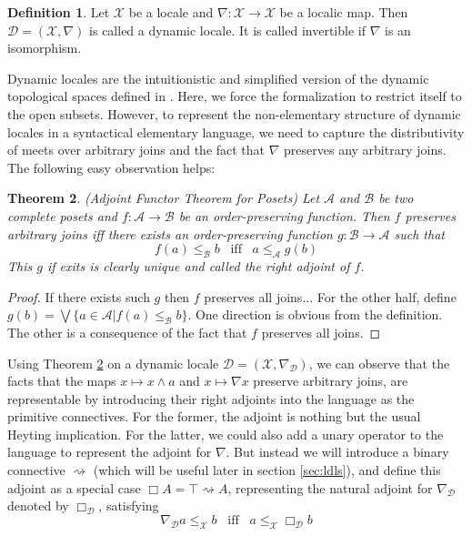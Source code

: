 \documentclass[12pt,a4paper]{article}
\theoremstyle{plain}
\newtheorem{thm}{Theorem}[section]
\theoremstyle{definition}
\newtheorem{dfn}[thm]{Definition}
\begin{document}
\begin{dfn}
Let $\mathscr{X}$ be a locale and $\nabla: \mathscr{X} \to \mathscr{X}$ be a localic map. Then $\mathcal{D}=(\mathscr{X}, \nabla)$ is called a dynamic locale. It is called invertible if $\nabla$ is an isomorphism.
\end{dfn}

Dynamic locales are the intuitionistic and simplified version of the dynamic topological spaces defined in \cite{}. Here, we force the formalization to restrict itself to the open subsets. However, to represent the non-elementary structure of dynamic locales in a syntactical elementary language, we need to capture the distributivity of meets over arbitrary joins and the fact that $\nabla$ preserves any arbitrary joins. The following easy observation helps:

\begin{thm}(Adjoint Functor Theorem for Posets) \label{AFT}
Let $\mathcal{A}$ and $\mathcal{B}$ be two complete posets and $f:\mathcal{A} \to \mathcal{B}$ be an order-preserving function. Then $f$ preserves arbitrary joins iff there exists an order-preserving function $g: \mathcal{B} \to \mathcal{A}$ such that
\[
f(a) \leq_{\mathcal{B}} b  \;\;\; \text{iff}  \;\;\; a \leq_{\mathcal{A}} g(b)
\]
This $g$ if exits is clearly unique and called the right adjoint of $f$.
\end{thm}
\begin{proof}
If there exists such $g$ then $f$ preserves all joins... For the other half, define $g(b)=\bigvee \{a \in \mathcal{A} | f(a) \leq_{\mathcal{B}} b \}$. One direction is obvious from the definition. The other is a consequence of the fact that $f$ preserves all joins.
\end{proof}

Using Theorem \ref{AFT} on a dynamic locale $\mathcal{D}=(\mathscr{X}, \nabla_{\mathcal{D}})$, we can observe that the facts that the maps $x \mapsto x \wedge a$ and $x \mapsto \nabla x$ preserve arbitrary joins, are representable by introducing their right adjoints into the language as the primitive connectives. For the former, the adjoint is nothing but the usual Heyting implication. For the latter, we could also add a unary operator to the language to represent the adjoint for $\nabla$. But instead we will introduce a binary connective $\rightsquigarrow$ (which will be useful later in section \ref{sec:ldls}), and define this adjoint as a special case $\Box A = \top \rightsquigarrow A$, representing the natural adjoint for $\nabla_\mathcal{D}$ denoted by $\Box_{\mathcal{D}}$, satisfying
\[
\nabla_{\mathcal{D}} a \leq_{\mathscr{X}} b  \;\;\; \text{iff}  \;\;\; a \leq_{\mathscr{X}} \Box_{\mathcal{D}} b
\]
\end{document}
